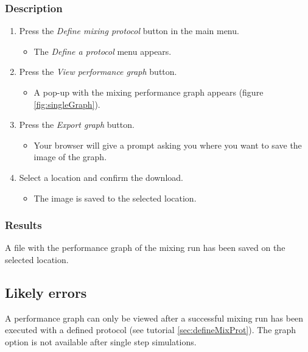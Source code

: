 \subsubsection{Description}
\begin{enumerate}
	\item  Press the \emph{Define mixing protocol} button in the main menu.
		\begin{itemize}
            		\item The \emph{Define a protocol} menu appears.
		\end{itemize}
			\item Press the \emph{View performance graph} button.
		\begin{itemize}
            		\item A pop-up with the mixing performance graph appears (figure \ref{fig:singleGraph}).
		\end{itemize}


    \item Press the \emph{Export graph} button.
		\begin{itemize}
             \item Your browser will give a prompt asking you where you want to save the image of the graph.
		\end{itemize}
    \item  Select a location and confirm the download.
		\begin{itemize}
           \item The image is saved to the selected location.
		\end{itemize}
\end{enumerate}

\subsubsection{Results}
A file with the performance graph of the mixing run has been saved on the selected location.

\subsection{Likely errors}
A performance graph can only be viewed after a successful mixing run has been executed with a defined protocol (see tutorial \ref{sec:defineMixProt}). The graph option is not available after single step simulations.

